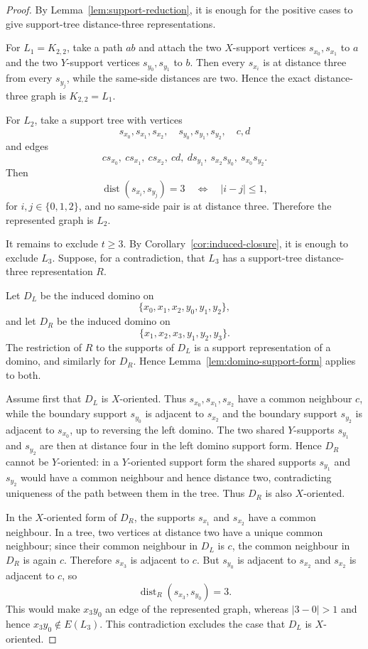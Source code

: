 \documentclass[11pt]{article}
\theoremstyle{definition}
\newcommand{\dist}{\operatorname{dist}}
\begin{document}
\begin{proof}
By Lemma~\ref{lem:support-reduction}, it is enough for the positive cases to give support-tree distance-three representations.

For $L_1=K_{2,2}$, take a path $a b$ and attach the two $X$-support vertices $s_{x_0},s_{x_1}$ to $a$ and the two $Y$-support vertices $s_{y_0},s_{y_1}$ to $b$.  Then every $s_{x_i}$ is at distance three from every $s_{y_j}$, while the same-side distances are two.  Hence the exact distance-three graph is $K_{2,2}=L_1$.

For $L_2$, take a support tree with vertices
\[
 s_{x_0},s_{x_1},s_{x_2},\quad s_{y_0},s_{y_1},s_{y_2},\quad c,d
\]
and edges
\[
 cs_{x_0},\ cs_{x_1},\ cs_{x_2},\ cd,\ ds_{y_1},\ s_{x_2}s_{y_0},\ s_{x_0}s_{y_2}.
\]
Then
\[
 \dist(s_{x_i},s_{y_j})=3
 \quad\Longleftrightarrow\quad |i-j|\le1,
\]
for $i,j\in\{0,1,2\}$, and no same-side pair is at distance three.  Therefore the represented graph is $L_2$.

It remains to exclude $t\ge3$.  By Corollary~\ref{cor:induced-closure}, it is enough to exclude $L_3$.  Suppose, for a contradiction, that $L_3$ has a support-tree distance-three representation $R$.

Let $D_L$ be the induced domino on
\[
 \{x_0,x_1,x_2,y_0,y_1,y_2\},
\]
and let $D_R$ be the induced domino on
\[
 \{x_1,x_2,x_3,y_1,y_2,y_3\}.
\]
The restriction of $R$ to the supports of $D_L$ is a support representation of a domino, and similarly for $D_R$.  Hence Lemma~\ref{lem:domino-support-form} applies to both.

Assume first that $D_L$ is $X$-oriented.  Thus $s_{x_0},s_{x_1},s_{x_2}$ have a common neighbour $c$, while the boundary support $s_{y_0}$ is adjacent to $s_{x_2}$ and the boundary support $s_{y_2}$ is adjacent to $s_{x_0}$, up to reversing the left domino.  The two shared $Y$-supports $s_{y_1}$ and $s_{y_2}$ are then at distance four in the left domino support form.  Hence $D_R$ cannot be $Y$-oriented: in a $Y$-oriented support form the shared supports $s_{y_1}$ and $s_{y_2}$ would have a common neighbour and hence distance two, contradicting uniqueness of the path between them in the tree.  Thus $D_R$ is also $X$-oriented.

In the $X$-oriented form of $D_R$, the supports $s_{x_1}$ and $s_{x_2}$ have a common neighbour.  In a tree, two vertices at distance two have a unique common neighbour; since their common neighbour in $D_L$ is $c$, the common neighbour in $D_R$ is again $c$.  Therefore $s_{x_3}$ is adjacent to $c$.  But $s_{y_0}$ is adjacent to $s_{x_2}$ and $s_{x_2}$ is adjacent to $c$, so
\[
 \dist_R(s_{x_3},s_{y_0})=3.
\]
This would make $x_3y_0$ an edge of the represented graph, whereas $|3-0|>1$ and hence $x_3y_0\notin E(L_3)$.  This contradiction excludes the case that $D_L$ is $X$-oriented.


\end{proof}
\end{document}
